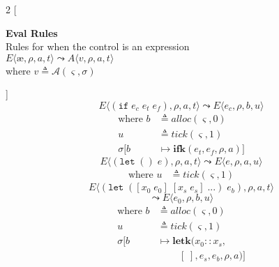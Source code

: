 \documentclass[12pt,draft]{article}
\newcommand\mae{\ensuremath{\text{\ae}}}
\newcommand{\ifsyn}[3]{(\texttt{if}\;#1\;#2\;#3)}
\begin{document}
\begin{multicols*}{2}
[
\begin{center}
\textbf{Eval Rules} \\
Rules for when the control is an expression \\
\vspace{5mm}
$E\langle \mae , \rho , a , t \rangle 
\leadsto 
A\langle v , \rho , a , t \rangle$ \\ 
where $v \triangleq \mathcal{A}(\varsigma, \sigma)$ \\
\vspace{-10mm}
\end{center}
]
\[
E\langle
\ifsyn{e_c}{e_t}{e_f} , \rho , a , t
\rangle
\leadsto
E\langle
e_c , \rho , b , u
\rangle
\]
\vspace{-13mm}
\begin{align*}
\text{where } b &\triangleq alloc(\varsigma, 0) \\
u &\triangleq tick(\varsigma, 1) \\
\sigma[b &\mapsto \textbf{ifk}(e_t, e_f, \rho, a)]
\end{align*}
\vspace{-5mm}
\[
E\langle
(\texttt{let}\;()\;e) , \rho , a , t
\rangle
\leadsto
E\langle
e , \rho , a , u
\rangle
\]
\vspace{-12mm}
\begin{align*}
\text{where } u &\triangleq tick(\varsigma, 1)
\end{align*}
\vspace{-5mm}
\[
E\langle
(\texttt{let}\;([x_0\;e_0]\;[x_s\;e_s]\;...)\;e_b) , \rho , a , t
\rangle
\]
\vspace{-7mm}
\[
\leadsto
E\langle
e_{0} , \rho , b , u
\rangle
\]
\vspace{-11mm}
\begin{align*}
\text{where } b &\triangleq alloc(\varsigma, 0) \\
u &\triangleq tick(\varsigma, 1) \\
\sigma[b &\mapsto \textbf{letk}(x_0::x_s, \\
&\;\;\;\;\;\;\;\; [\;], e_s, e_b, \rho, a)]
\end{align*}
\vspace{-5mm}

\end{multicols*}
\end{document}
